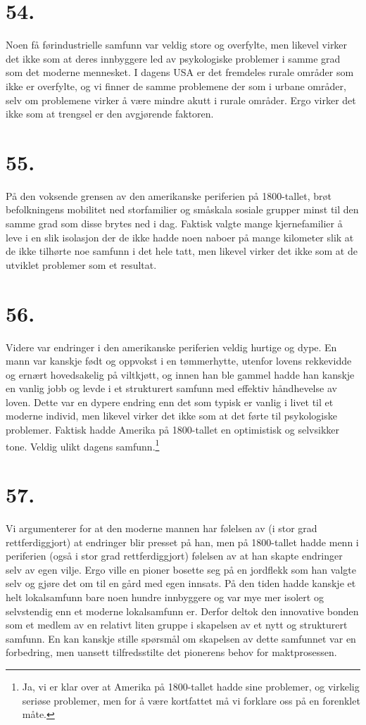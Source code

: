 \documentclass[oneside]{book}
\begin{document}
\section*{54.}
Noen få førindustrielle samfunn var veldig store og overfylte, men likevel
virker det ikke som at deres innbyggere led av psykologiske problemer i samme
grad som det moderne mennesket. I dagens USA er det fremdeles rurale områder
som ikke er overfylte, og vi finner de samme problemene der som i urbane
områder, selv om problemene virker å være mindre akutt i rurale områder. Ergo
virker det ikke som at trengsel er den avgjørende faktoren. 

\section*{55.}
På den voksende grensen av den amerikanske periferien på 1800-tallet, brøt
befolkningens mobilitet ned storfamilier og småskala sosiale grupper minst til
den samme grad som disse brytes ned i dag. Faktisk valgte mange kjernefamilier
å leve i en slik isolasjon der de ikke hadde noen naboer på mange kilometer
slik at de ikke tilhørte noe samfunn i det hele tatt, men likevel virker det
ikke som at de utviklet problemer som et resultat.

\section*{56.}
Videre var endringer i den amerikanske periferien veldig hurtige og dype. En
mann var kanskje født og oppvokst i en tømmerhytte, utenfor lovens rekkevidde
og ernært hovedsakelig på viltkjøtt, og innen han ble gammel hadde han kanskje
en vanlig jobb og levde i et strukturert samfunn med effektiv håndhevelse av
loven. Dette var en dypere endring enn det som typisk er vanlig i livet til et
moderne individ, men likevel virker det ikke som at det førte til psykologiske
problemer. Faktisk hadde Amerika på 1800-tallet en optimistisk og selvsikker
tone. Veldig ulikt dagens samfunn.\footnote{Ja, vi er klar over at Amerika på
1800-tallet hadde sine problemer, og virkelig seriøse problemer, men for å være
kortfattet må vi forklare oss på en forenklet måte.}

\section*{57.}
Vi argumenterer for at den moderne mannen har følelsen av (i stor grad
rettferdiggjort) at endringer blir presset på han, men på 1800-tallet hadde
menn i periferien (også i stor grad rettferdiggjort) følelsen av at han skapte
endringer selv av egen vilje. Ergo ville en pioner bosette seg på en jordflekk
som han valgte selv og gjøre det om til en gård med egen innsats. På den tiden
hadde kanskje et helt lokalsamfunn bare noen hundre innbyggere og var mye mer
isolert og selvstendig enn et moderne lokalsamfunn er. Derfor deltok den
innovative bonden som et medlem av en relativt liten gruppe i skapelsen av et
nytt og strukturert samfunn. En kan kanskje stille spørsmål om skapelsen av
dette samfunnet var en forbedring, men uansett tilfredsstilte det pionerens
behov for maktprosessen.
\end{document}
